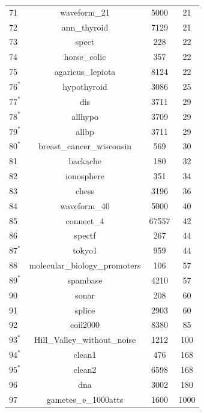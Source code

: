 \documentclass[a4paper,american,reqno]{amsart}
\begin{document}
\begin{center}
\begin{longtable}{l c c c }
    71 &  waveform\_21        &  5000  &  21   \\
    72 &  ann\_thyroid            &  7129  &  21   \\
    73 &  spect   &  228   &  22   \\
    74 &  horse\_colic            &  357   &  22   \\
    75 &  agaricus\_lepiota         &  8124  &  22   \\
    $76^*$ &  hypothyroid              &  3086  &  25   \\
    $77^*$ &  dis                  &  3711  &  29   \\
    $78^*$ &  allhypo      &  3709  &  29   \\
    $79^*$ &  allbp                                       &  3711  &  29   \\
    $80^*$ &  breast\_cancer\_wisconsin           &  569   &  30   \\
    81 &  backache &  180   &  32   \\
    82 &  ionosphere        &  351   &  34   \\
    83 &  chess        &  3196  &  36   \\
    84 &  waveform\_40    &  5000  &  40   \\
    85 &  connect\_4                   &  67557 &  42   \\
    86 &  spectf      &  267   &  44   \\
    $87^*$ &  tokyo1      &  959   &  44   \\
    88 &  molecular\_biology\_promoters       &  106   &  57   \\
    $89^*$ &  spambase            &  4210  &  57   \\
    90 &  sonar         &  208   &  60   \\
    91 &  splice        &  2903  &  60   \\
    92 &  coil2000       &  8380  &  85   \\
    $93^*$ &  Hill\_Valley\_without\_noise     &  1212  &  100  \\
    $94^*$ &  clean1        &  476   &  168  \\
    $95^*$ &  clean2                  &  6598  &  168  \\
    96 &  dna                         &  3002  &  180  \\
    97 &  gametes\_e\_1000atts       &  1600  &  1000 \\
    \bottomrule
  \end{longtable}
\end{center}
\end{document}
